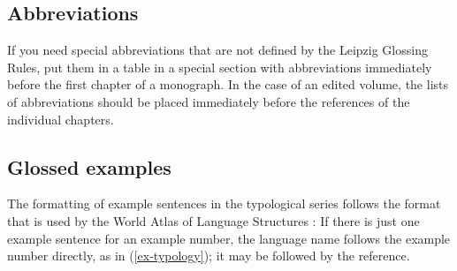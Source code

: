 \subsection{Abbreviations}
If you need special abbreviations that are not defined by the Leipzig Glossing Rules, put them in a table in a special section with abbreviations immediately before the first chapter of a monograph. In the case of an edited volume, the lists of abbreviations should be placed immediately before the references of the individual chapters.

\subsection{Glossed examples}
The formatting of example sentences in the typological series follows the format that is used by the World Atlas of Language Structures \citep{WALS}: If there is just one example sentence for an example number, the language name follows the example number directly, as in (\ref{ex-typology}); it may be followed by the reference.

